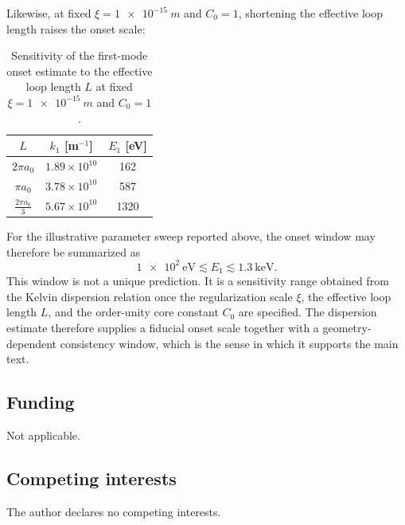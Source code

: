 \documentclass[pdflatex,sn-mathphys-num]{sn-jnl}
\begin{document}
        Likewise, at fixed $\xi=\SI{1e-15}{m}$ and $C_0=1$, shortening the effective loop length raises the onset scale:
        \begin{table}[htbp]
            \centering
            \caption{Sensitivity of the first-mode onset estimate to the effective loop length $L$ at fixed $\xi=\SI{1e-15}{m}$ and $C_0=1$.}
            \begin{tabular}{ccc}
                \toprule
                $L$ & $k_1$ [m$^{-1}$] & $E_1$ [eV] \\
                \midrule
                $2\pi a_0$      & $1.89\times 10^{10}$ & 162  \\
                $\pi a_0$       & $3.78\times 10^{10}$ & 587  \\
                $\tfrac{2\pi a_0}{3}$ & $5.67\times 10^{10}$ & 1320 \\
                \bottomrule
            \end{tabular}
            \label{tab:L-sensitivity}
        \end{table}

        For the illustrative parameter sweep reported above, the onset window may therefore be summarized as
        \begin{equation}
            \SI{1e2}{\electronvolt} \lesssim E_1 \lesssim \SI{1.3}{\kilo\electronvolt}.
        \end{equation}
        This window is not a unique prediction. It is a sensitivity range obtained from the Kelvin dispersion relation once the regularization scale $\xi$, the effective loop length $L$, and the order-unity core constant $C_0$ are specified. The dispersion estimate therefore supplies a fiducial onset scale together with a geometry-dependent consistency window, which is the sense in which it supports the main text.

        \backmatter

        \subsection*{Funding}
            Not applicable.

        \subsection*{Competing interests}
            The author declares no competing interests.
\end{document}
